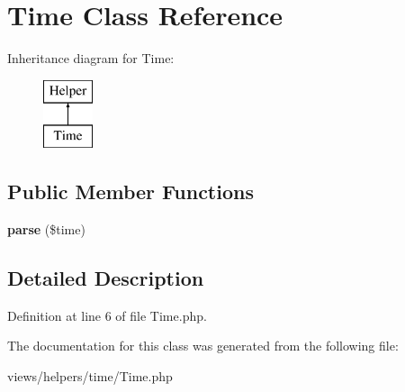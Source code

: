 \hypertarget{class_time}{
\section{Time Class Reference}
\label{class_time}
}
Inheritance diagram for Time:\begin{figure}[H]
\begin{center}
\leavevmode
\includegraphics[height=2.000000cm]{class_time}
\end{center}
\end{figure}
\subsection*{Public Member Functions}
\begin{DoxyCompactItemize}
\item 
\hypertarget{class_time_af5b312b9f4c90d4a543d4f4b7598b3aa}{
{\bfseries parse} (\$time)}
\label{class_time_af5b312b9f4c90d4a543d4f4b7598b3aa}

\end{DoxyCompactItemize}


\subsection{Detailed Description}


Definition at line 6 of file Time.php.



The documentation for this class was generated from the following file:\begin{DoxyCompactItemize}
\item 
views/helpers/time/Time.php\end{DoxyCompactItemize}
